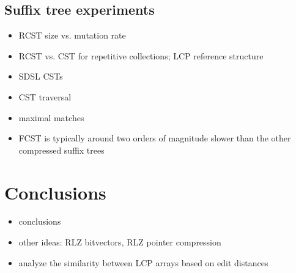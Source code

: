 \documentclass[a4paper,11pt]{llncs}
\newcommand{\FCST}{\textsf{FCST}}
\begin{document}
\subsection{Suffix tree experiments}

\begin{itemize}
\item RCST size vs. mutation rate
\item RCST vs. CST for repetitive collections; LCP reference structure
\item SDSL CSTs
\item CST traversal
\item maximal matches
\item \FCST{} is typically around two orders of magnitude slower than the other compressed suffix trees \cite{Abeliuk2013}
\end{itemize}


\section{Conclusions}\label{section:conclusions}

\begin{itemize}
\item conclusions
\item other ideas: RLZ bitvectors, RLZ pointer compression
\item analyze the similarity between LCP arrays based on edit distances
\end{itemize}




\end{document}
